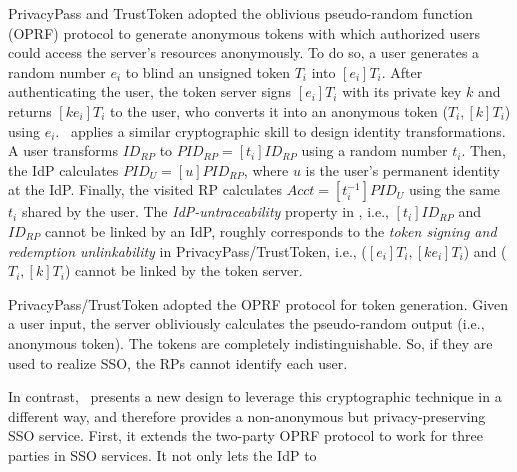 \newc
PrivacyPass and TrustToken \cite{privacypass,trusttoken}
adopted the oblivious pseudo-random function (OPRF) protocol \cite{oprf-proved,voprf-proved,oprf-bitcoin-wallet} to generate anonymous tokens with which authorized users could access the server's resources anonymously.
To do so, a user generates a random number $e_i$ to blind an unsigned token $T_i$ into $[e_i]T_i$. After authenticating the user, the token server signs $[e_i]T_i$ with its private key $k$ and returns $[k e_i]T_i$ to the user, who converts it into an anonymous token  ($T_i, [k]T_i$) using $e_i$. 
\usso\ applies a similar cryptographic skill to design identity transformations. A user transforms $ID_{RP}$ to $PID_{RP} = [t_i]ID_{RP}$ using a random number $t_i$.
Then, the IdP calculates $PID_U = [u]PID_{RP}$, %
where $u$ is the user's permanent identity at the IdP.
Finally, the visited RP calculates $Acct = [t_i^{-1}]PID_{U}$ using the same $t_i$ shared by the user.
The \emph{IdP-untraceability} property in \usso, i.e., $[t_i]ID_{RP}$ and $ID_{RP}$ cannot be linked by an IdP, roughly corresponds to
the {\em token signing and redemption unlinkability} in PrivacyPass/TrustToken, i.e., ($[e_i]T_i, [ke_i]T_i$) and  ($T_i, [k]T_i$) cannot be linked by the token server.

PrivacyPass/TrustToken adopted the OPRF protocol for token generation. Given a user input, the server obliviously calculates the pseudo-random output (i.e., anonymous token). The tokens are completely indistinguishable. So, if they are used to realize SSO, the RPs cannot identify each user.

In contrast, \usso\ presents a new design to leverage this cryptographic technique %
in a different way, and therefore provides a non-anonymous but privacy-preserving SSO service. First, it extends the two-party OPRF protocol to work for three parties in SSO services. It not only lets the IdP to 

